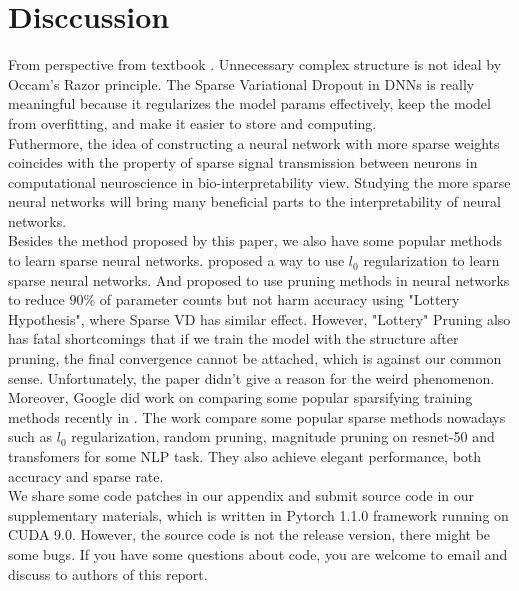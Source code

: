 \documentclass{article}
\begin{document}
	\section{Disccussion}
	From perspective from textbook \cite{shalev2014understanding}. Unnecessary complex structure is not ideal by Occam’s Razor principle. The Sparse Variational Dropout in DNNs is really meaningful because it regularizes the model params effectively, keep the model from overfitting, and make it easier to store and computing.\\
	Futhermore, the idea of constructing a neural network with more sparse weights coincides with the property of sparse signal transmission between neurons in computational neuroscience \cite{1611.06694} in bio-interpretability view. Studying the more sparse neural networks will bring many beneficial parts to the interpretability of neural networks.\\
	Besides the method proposed by this paper, we also have some popular methods to learn sparse neural networks. \cite{louizos2017learning} proposed a way to use $l_0$ regularization to learn sparse neural networks. And \cite{1803.03635} proposed to use pruning methods in neural networks to reduce $90\%$ of parameter counts but not harm accuracy using "Lottery Hypothesis", where Sparse VD has similar effect. However, "Lottery" Pruning also has fatal shortcomings that if we train the model with the structure after pruning, the final convergence cannot be attached, which is against our common sense. Unfortunately, the paper didn’t give a reason for the weird phenomenon.\\
	Moreover, Google did work on comparing some popular sparsifying training methods recently in \cite{gale2019state}. The work compare some popular sparse methods nowadays such as $l_0$ regularization, random pruning, magnitude pruning on resnet-50 and transfomers for some NLP task. They also achieve elegant performance, both accuracy and sparse rate.\\
	We share some code patches in our appendix and submit source code in our supplementary materials, which is written in Pytorch 1.1.0 framework running on CUDA 9.0. However, the source code is not the release version, there might be some bugs. If you have some questions about code, you are welcome to email and discuss to authors of this report.\\

\clearpage




\end{document}

